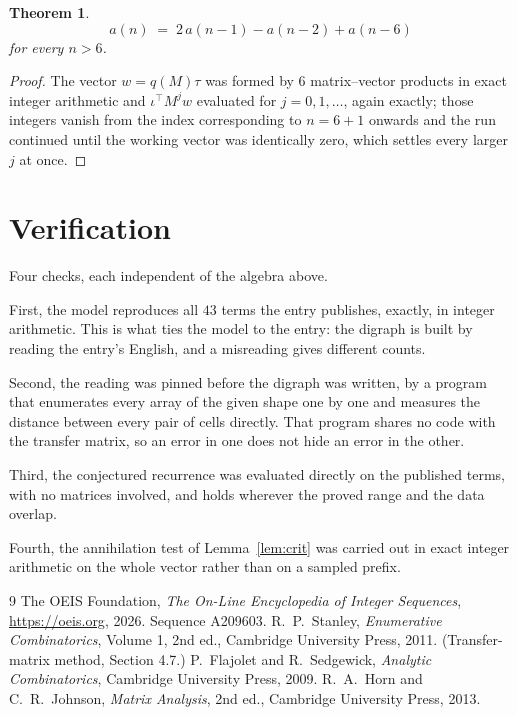 \documentclass[11pt,a4paper]{article}
\theoremstyle{plain}
\newtheorem{theorem}{Theorem}
\theoremstyle{definition}
\begin{document}
\begin{theorem}
\[
a(n)\;=\;2\,a(n-1) - a(n-2) + a(n-6)
\]
for every $n>6$.
\end{theorem}

\begin{proof}
The vector $w=q(M)\tau$ was formed by $6$ matrix--vector products in exact integer
arithmetic and $\iota^{\!\top}M^{j}w$ evaluated for $j=0,1,\dots$, again exactly; those
integers vanish from the index corresponding to $n=6+1$ onwards and the run continued
until the working vector was identically zero, which settles every larger $j$ at once.
\end{proof}

\section{Verification}

Four checks, each independent of the algebra above.

First, the model reproduces all $43$ terms the entry publishes, exactly, in integer
arithmetic. This is what ties the model to the entry: the digraph is built by reading the
entry's English, and a misreading gives different counts.

Second, the reading was pinned before the digraph was written, by a program that enumerates
every array of the given shape one by one and measures the distance between every pair
of cells directly. That program shares no code with the transfer matrix, so an error in one does not
hide an error in the other.

Third, the conjectured recurrence was evaluated directly on the published terms, with no
matrices involved, and holds wherever the proved range and the data overlap.

Fourth, the annihilation test of Lemma~\ref{lem:crit} was carried out in exact integer
arithmetic on the whole vector rather than on a sampled prefix.

\begin{thebibliography}{9}
 The OEIS Foundation, \emph{The On-Line Encyclopedia of Integer
Sequences}, \url{https://oeis.org}, 2026. Sequence A209603.
 R.~P.~Stanley, \emph{Enumerative Combinatorics}, Volume 1, 2nd ed.,
Cambridge University Press, 2011. (Transfer-matrix method, Section 4.7.)
 P.~Flajolet and R.~Sedgewick, \emph{Analytic Combinatorics}, Cambridge
University Press, 2009.
 R.~A.~Horn and C.~R.~Johnson, \emph{Matrix Analysis}, 2nd ed., Cambridge
University Press, 2013.
\end{thebibliography}
\end{document}
